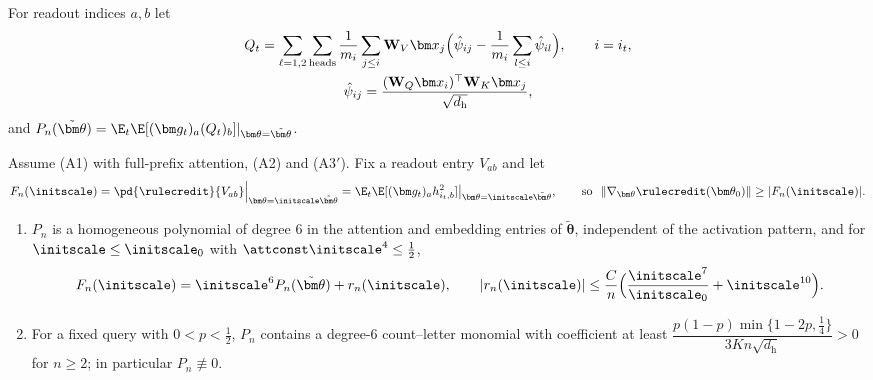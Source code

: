 For readout indices $a,b$ let
\begin{gather*}
 Q_t=\sum_{\ell=1,2}\sum_{\mathrm{heads}}\frac{1}{m_i}\sum_{j\le i}\mathbf W_V\bm x_j\Bigl(\hat\psi_{ij}-\frac{1}{m_i}\sum_{l\le i}\hat\psi_{il}\Bigr),\qquad i=i_t,\\
 \hat\psi_{ij}=\frac{(\mathbf W_Q\bm x_i)^\top\mathbf W_K\bm x_j}{\sqrt{d_{\mathrm h}}},
\end{gather*}
and $P_n(\tilde{\bm\theta})=\E_t\E[(\bm g_t)_a(Q_t)_b]|_{\bm\theta=\tilde{\bm\theta}}$.

\begin{lemma}
\label{lem:leading}
Assume (A1) with full-prefix attention, (A2) and (A3$'$). Fix a readout entry $V_{ab}$ and let
\[
 F_n(\initscale)=\pd{\rulecredit}{V_{ab}}\Big|_{\bm\theta=\initscale\tilde{\bm\theta}}=\E_t\E[(\bm g_t)_ah^2_{i_t,b}]\big|_{\bm\theta=\initscale\tilde{\bm\theta}},\qquad\text{so }\ \|\nabla_{\bm\theta}\rulecredit(\bm\theta_0)\|\ge|F_n(\initscale)|.
\]
\begin{enumerate}[label=(\roman*),leftmargin=*,itemsep=0pt,topsep=2pt]
\item $P_n$ is a homogeneous polynomial of degree $6$ in the attention and embedding entries of $\tilde{\bm\theta}$, independent of the activation
pattern, and for $\initscale\le\initscale_0$ with $\attconst\initscale^4\le\frac{1}{2}$,
\[
 F_n(\initscale)=\initscale^6P_n(\tilde{\bm\theta})+r_n(\initscale),\qquad |r_n(\initscale)|\le\frac{C}{n}\Bigl(\frac{\initscale^7}{\initscale_0}+\initscale^{10}\Bigr).
\]
\item For a fixed query with $0<p<\frac{1}{2}$, $P_n$ contains a degree-$6$ count--letter monomial with coefficient at least
$\dfrac{p(1-p)\min\{1-2p,\frac{1}{4}\}}{3Kn\sqrt{d_{\mathrm h}}}>0$ for $n\ge2$; in particular $P_n\not\equiv0$.
\end{enumerate}
\end{lemma}


